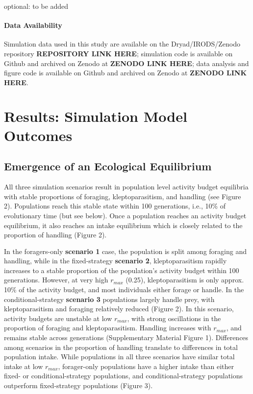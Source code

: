 \documentclass[11pt]{article}
\begin{document}
optional: to be added

\paragraph*{Data Availability}

Simulation data used in this study are available on the Dryad/IRODS/Zenodo repository \textbf{REPOSITORY LINK HERE}; 
simulation code is available on Github and archived on Zenodo at \textbf{ZENODO LINK HERE}; 
data analysis and figure code is available on Github and archived on Zenodo at \textbf{ZENODO LINK HERE}.

\section{Results: Simulation Model Outcomes}

\subsection{Emergence of an Ecological Equilibrium}

All three simulation scenarios result in population level activity budget equilibria with stable proportions of foraging, kleptoparasitism, and handling (see Figure 2).
Populations reach this stable state within 100 generations, i.e., 10\% of evolutionary time (but see below).
Once a population reaches an activity budget equilibrium, it also reaches an intake equilibrium which is closely related to the proportion of handling (Figure 2).

In the foragers-only \textbf{scenario 1} case, the population is split among foraging and handling, while in the fixed-strategy \textbf{scenario 2}, kleptoparasitism rapidly increases to a stable proportion of the population's activity budget within 100 generations.
However, at very high $r_{max}$ (0.25), kleptoparasitism is only approx. 10\% of the activity budget, and most individuals either forage or handle.
In the conditional-strategy \textbf{scenario 3} populations largely handle prey, with kleptoparasitism and foraging relatively reduced (Figure 2).
In this scenario, activity budgets are unstable at low $r_{max}$, with strong oscillations in the proportion of foraging and kleptoparasitism.
Handling increases with $r_{max}$, and remains stable across generations (Supplementary Material Figure 1).
Differences among scenarios in the proportion of handling translate to differences in total population intake.
While populations in all three scenarios have similar total intake at low $r_{max}$, forager-only populations have a higher intake than either fixed- or conditional-strategy populations, and conditional-strategy populations outperform fixed-strategy populations (Figure 3).
\end{document}
